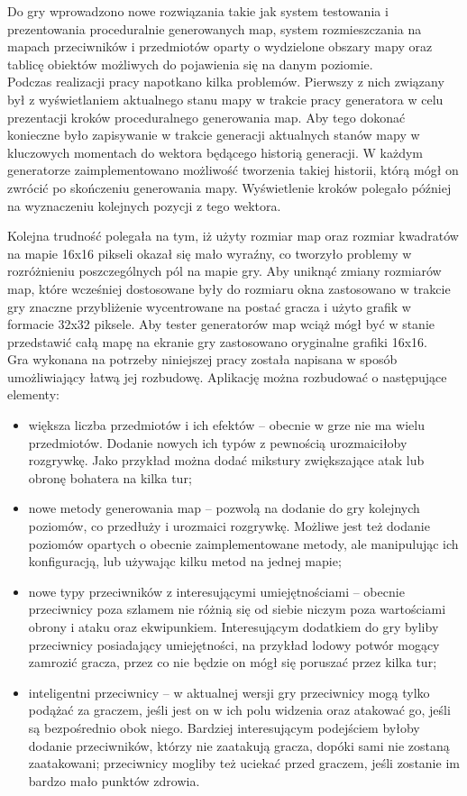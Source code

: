 \documentclass[12pt,twoside]{article}
\begin{document}
Do gry wprowadzono nowe rozwiązania takie jak system testowania i prezentowania proceduralnie generowanych map, system rozmieszczania na mapach przeciwników i przedmiotów oparty o wydzielone obszary mapy oraz tablicę obiektów możliwych do pojawienia się na danym poziomie.
\\

Podczas realizacji pracy napotkano kilka problemów. Pierwszy z nich związany był z wyświetlaniem aktualnego stanu mapy w trakcie pracy generatora w celu prezentacji kroków proceduralnego generowania map. Aby tego dokonać konieczne było zapisywanie w trakcie generacji aktualnych stanów mapy w kluczowych momentach do wektora będącego historią generacji. W każdym generatorze zaimplementowano możliwość tworzenia takiej historii, którą mógł on zwrócić po skończeniu generowania mapy. Wyświetlenie kroków polegało później na wyznaczeniu kolejnych pozycji z tego wektora.

Kolejna trudność polegała na tym, iż użyty rozmiar map oraz rozmiar kwadratów na mapie 16x16 pikseli okazał się mało wyraźny, co tworzyło problemy w rozróżnieniu poszczególnych pól na mapie gry. Aby uniknąć zmiany rozmiarów map, które wcześniej dostosowane były do rozmiaru okna zastosowano w trakcie gry znaczne przybliżenie wycentrowane na postać gracza i użyto grafik w formacie 32x32 piksele. Aby tester generatorów map wciąż mógł być w stanie przedstawić całą mapę na ekranie gry zastosowano oryginalne grafiki 16x16. \\


Gra wykonana na potrzeby niniejszej pracy została napisana w sposób umożliwiający łatwą jej rozbudowę. Aplikację można rozbudować o następujące elementy:
\begin{itemize}
	\item większa liczba przedmiotów i ich efektów -- obecnie w grze nie ma wielu przedmiotów. Dodanie nowych ich typów z pewnością urozmaiciłoby rozgrywkę. Jako przykład można dodać mikstury zwiększające atak lub obronę bohatera na kilka tur;
	\item nowe metody generowania map -- pozwolą na dodanie do gry kolejnych poziomów, co przedłuży i urozmaici rozgrywkę. Możliwe jest też dodanie poziomów opartych o obecnie zaimplementowane metody, ale manipulując ich konfiguracją, lub używając kilku metod na jednej mapie;
	\item nowe typy przeciwników z interesującymi umiejętnościami -- obecnie przeciwnicy poza szlamem nie różnią się od siebie niczym poza wartościami obrony i ataku oraz ekwipunkiem. Interesującym dodatkiem do gry byliby przeciwnicy posiadający umiejętności, na przykład lodowy potwór mogący zamrozić gracza, przez co nie będzie on mógł się poruszać przez kilka tur;
	\item inteligentni przeciwnicy -- w aktualnej wersji gry przeciwnicy mogą tylko podążać za graczem, jeśli jest on w ich polu widzenia oraz atakować go, jeśli są bezpośrednio obok niego. Bardziej interesującym podejściem byłoby dodanie przeciwników, którzy nie zaatakują gracza, dopóki sami nie zostaną zaatakowani; przeciwnicy mogliby też uciekać przed graczem, jeśli zostanie im bardzo mało punktów zdrowia.
\end{itemize}
\end{document}
